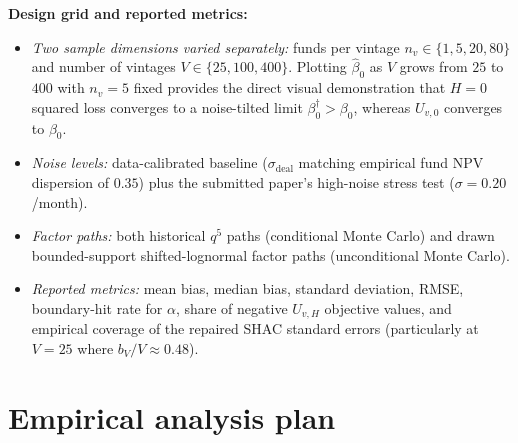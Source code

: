 \documentclass[11pt]{article}
\begin{document}
\textbf{Design grid and reported metrics:}
\begin{itemize}
\item \emph{Two sample dimensions varied separately:} funds per vintage $n_v\in\{1,5,20,80\}$ and number of vintages $V\in\{25,100,400\}$. Plotting $\hat\beta_0$ as $V$ grows from $25$ to $400$ with $n_v=5$ fixed provides the direct visual demonstration that $H=0$ squared loss converges to a noise-tilted limit $\beta_0^\dagger>\beta_0$, whereas $U_{v,0}$ converges to $\beta_0$.
\item \emph{Noise levels:} data-calibrated baseline ($\sigma_{\mathrm{deal}}$ matching empirical fund NPV dispersion of $0.35$) plus the submitted paper's high-noise stress test ($\sigma=0.20$/month).
\item \emph{Factor paths:} both historical $q^5$ paths (conditional Monte Carlo) and drawn bounded-support shifted-lognormal factor paths (unconditional Monte Carlo).
\item \emph{Reported metrics:} mean bias, median bias, standard deviation, RMSE, boundary-hit rate for $\alpha$, share of negative $U_{v,H}$ objective values, and empirical coverage of the repaired SHAC standard errors (particularly at $V=25$ where $b_V/V\approx 0.48$).
\end{itemize}

\section{Empirical analysis plan}
\label{sec:emp}
\end{document}
